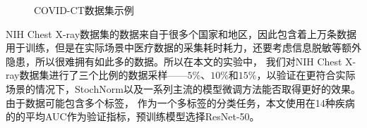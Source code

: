 \begin{figure}
  \centering
  \caption{COVID-CT数据集示例}
  \label{fig:covid}
\end{figure}


NIH Chest X-ray数据集的数据来自于很多个国家和地区，因此包含着上万条数据用于训练，但是在实际场景中医疗数据的采集耗时耗力，还要考虑信息脱敏等额外隐患，所以很难拥有如此多的数据。所以在本文的实验中，
我们对NIH Chest X-ray数据集进行了三个比例的数据采样——$5\%$、$10\%$和$15\%$，以验证在更符合实际场景的情况下，StochNorm以及一系列主流的模型微调方法能否取得更好的效果。由于数据可能包含多个标签，
作为一个多标签的分类任务，本文使用在14种疾病的的平均AUC作为验证指标，预训练模型选择ResNet-50。

